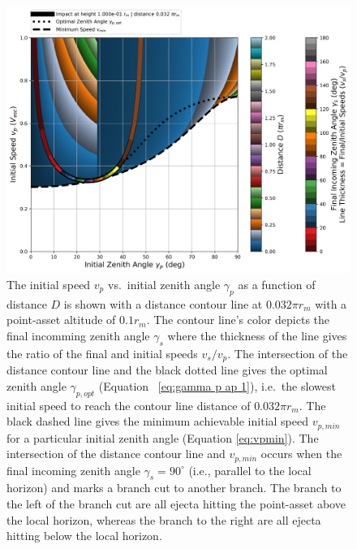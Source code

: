 \documentclass{article}
\begin{document}
\begin{figure}[!htb]
	\centering
	\includegraphics[width=1.0\linewidth]{dist_speed_zenith_plot_021_1.000e-01_0.100.png}
	\caption{The initial speed $v_p$ vs.\ initial zenith angle $\gamma_p$ as a function of distance $D$ is shown with a distance contour line at $0.032\pi r_m$ with a point-asset altitude of $0.1 r_m$. The contour line's color depicts the final incomming zenith angle $\gamma_s$ where the thickness of the line gives the ratio of the final and initial speeds $v_s/v_p$. The intersection of the distance contour line and the black dotted line gives the optimal zenith angle $\gamma_{p,opt}$ (Equation~
		\eqref{eq:gamma p ap 1}), i.e.\ the slowest initial speed to reach the contour line distance of $0.032\pi r_m$. The black dashed line gives the minimum achievable initial speed $v_{p,min}$ for a particular initial zenith angle (Equation \eqref{eq:vpmin}). The intersection of the distance contour line and $v_{p,min}$ occurs when the final incoming zenith angle $\gamma_s = 90^\circ$ (i.e., parallel to the local horizon) and marks a branch cut to another branch. The branch to the left of the branch cut are all ejecta hitting the point-asset above the local horizon, whereas the branch to the right are all ejecta hitting below the local horizon.}\label{fig:dist_speed_zenith_plot_021_1.000e-01_0.100}
\end{figure}
\end{document}
